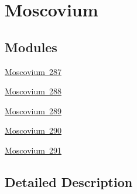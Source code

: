 \hypertarget{group___isotope_const-_moscovium}{}\section{Moscovium}
\label{group___isotope_const-_moscovium}
\subsection*{Modules}
\begin{DoxyCompactItemize}
\item 
\mbox{\hyperlink{group___isotope_const-_moscovium-_mc287}{Moscovium 287}}
\item 
\mbox{\hyperlink{group___isotope_const-_moscovium-_mc288}{Moscovium 288}}
\item 
\mbox{\hyperlink{group___isotope_const-_moscovium-_mc289}{Moscovium 289}}
\item 
\mbox{\hyperlink{group___isotope_const-_moscovium-_mc290}{Moscovium 290}}
\item 
\mbox{\hyperlink{group___isotope_const-_moscovium-_mc291}{Moscovium 291}}
\end{DoxyCompactItemize}


\subsection{Detailed Description}

